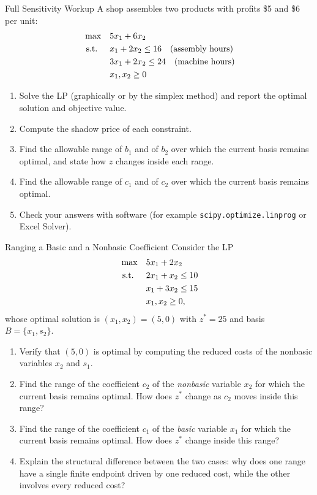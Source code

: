 \begin{ex}{Full Sensitivity Workup}{}
\label{ex:sensitivity-workup-2x2}
 A shop assembles two products with profits \$5 and \$6 per unit:
\[
\begin{aligned}
\max \quad & 5x_1 + 6x_2 \\
\text{ s.t. } \quad
& x_1 + 2x_2 \leq 16 \quad \text{(assembly hours)} \\
& 3x_1 + 2x_2 \leq 24 \quad \text{(machine hours)} \\
& x_1, x_2 \geq 0
\end{aligned}
\]
\begin{enumerate}
\item Solve the LP (graphically or by the simplex method) and report the optimal solution and objective value.
\item Compute the shadow price of each constraint.
\item Find the allowable range of $b_1$ and of $b_2$ over which the current basis remains optimal, and state how $z$ changes inside each range.
\item Find the allowable range of $c_1$ and of $c_2$ over which the current basis remains optimal.
\item Check your answers with software (for example \texttt{scipy.optimize.linprog} or Excel Solver).
\end{enumerate}
\exrefs{\S\ref{sec:sensitivity-rhs}, \S\ref{sec:sensitivity-cost}, \S\ref{sec:sensitivity-matrix}}
\end{ex}

\begin{ex}{Ranging a Basic and a Nonbasic Coefficient}{}
\label{ex:sensitivity-obj-nonbasic}
 Consider the LP
\[
\begin{aligned}
\max \quad & 5x_1 + 2x_2 \\
\text{ s.t. } \quad
& 2x_1 + x_2 \leq 10 \\
& x_1 + 3x_2 \leq 15 \\
& x_1, x_2 \geq 0,
\end{aligned}
\]
whose optimal solution is $(x_1, x_2) = (5, 0)$ with $z^* = 25$ and basis $B = \{x_1, s_2\}$.
\begin{enumerate}
\item Verify that $(5,0)$ is optimal by computing the reduced costs of the nonbasic variables $x_2$ and $s_1$.
\item Find the range of the coefficient $c_2$ of the \emph{nonbasic} variable $x_2$ for which the current basis remains optimal. How does $z^*$ change as $c_2$ moves inside this range?
\item Find the range of the coefficient $c_1$ of the \emph{basic} variable $x_1$ for which the current basis remains optimal. How does $z^*$ change inside this range?
\item Explain the structural difference between the two cases: why does one range have a single finite endpoint driven by one reduced cost, while the other involves every reduced cost?
\end{enumerate}
\exrefs{\S\ref{sec:sensitivity-cost}, \S\ref{sec:sensitivity-overview}}
\end{ex}

